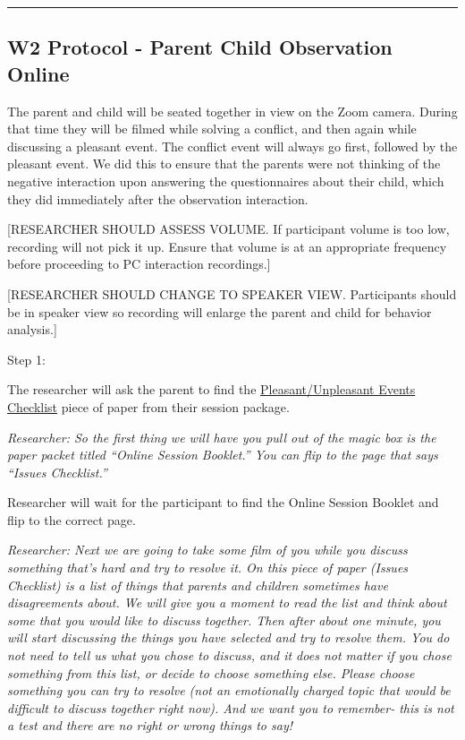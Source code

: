 \documentclass[
]{book}
\begin{document}
\begin{center}\rule{0.5\linewidth}{0.5pt}\end{center}

\hypertarget{w2-protocol---parent-child-observation-online}{%
\subsection{W2 Protocol - Parent Child Observation Online}\label{w2-protocol---parent-child-observation-online}}

The parent and child will be seated together in view on the Zoom camera. During that time they will be filmed while solving a conflict, and then again while discussing a pleasant event. The conflict event will always go first, followed by the pleasant event. We did this to ensure that the parents were not thinking of the negative interaction upon answering the questionnaires about their child, which they did immediately after the observation interaction.

{[}RESEARCHER SHOULD ASSESS VOLUME. If participant volume is too low, recording will not pick it up. Ensure that volume is at an appropriate frequency before proceeding to PC interaction recordings.{]}

{[}RESEARCHER SHOULD CHANGE TO SPEAKER VIEW. Participants should be in speaker view so recording will enlarge the parent and child for behavior analysis.{]}

Step 1:

The researcher will ask the parent to find the \href{https://ucla.app.box.com/file/630327764749}{Pleasant/Unpleasant Events Checklist} piece of paper from their session package.

\emph{Researcher: So the first thing we will have you pull out of the magic box is the paper packet titled ``Online Session Booklet.'' You can flip to the page that says ``Issues Checklist.''}

Researcher will wait for the participant to find the Online Session Booklet and flip to the correct page.

\emph{Researcher: Next we are going to take some film of you while you discuss something that's hard and try to resolve it. On this piece of paper (Issues Checklist) is a list of things that parents and children sometimes have disagreements about. We will give you a moment to read the list and think about some that you would like to discuss together. Then after about one minute, you will start discussing the things you have selected and try to resolve them. You do not need to tell us what you chose to discuss, and it does not matter if you chose something from this list, or decide to choose something else. Please choose something you can try to resolve (not an emotionally charged topic that would be difficult to discuss together right now). And we want you to remember- this is not a test and there are no right or wrong things to say!}
\end{document}
